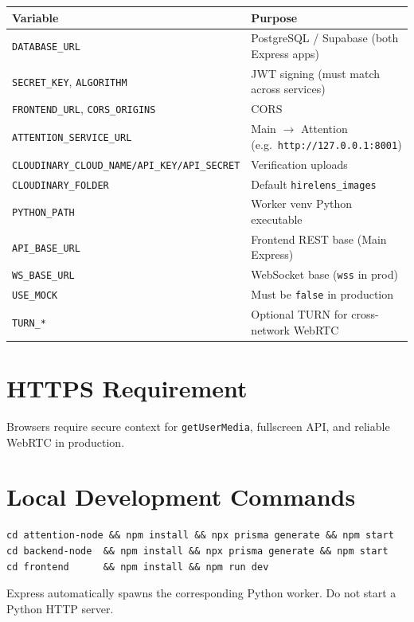 \documentclass[11pt,a4paper]{report}
\begin{document}
\begin{table}[H]
\centering
\small
\begin{tabularx}{\textwidth}{@{}lX@{}}
\toprule
\textbf{Variable} & \textbf{Purpose} \\
\midrule
\texttt{DATABASE\_URL} & PostgreSQL / Supabase (both Express apps) \\
\texttt{SECRET\_KEY}, \texttt{ALGORITHM} & JWT signing (must match across services) \\
\texttt{FRONTEND\_URL}, \texttt{CORS\_ORIGINS} & CORS \\
\texttt{ATTENTION\_SERVICE\_URL} & Main $\rightarrow$ Attention (e.g.\ \texttt{http://127.0.0.1:8001}) \\
\texttt{CLOUDINARY\_CLOUD\_NAME/API\_KEY/API\_SECRET} & Verification uploads \\
\texttt{CLOUDINARY\_FOLDER} & Default \texttt{hirelens\_images} \\
\texttt{PYTHON\_PATH} & Worker venv Python executable \\
\texttt{API\_BASE\_URL} & Frontend REST base (Main Express) \\
\texttt{WS\_BASE\_URL} & WebSocket base (\texttt{wss} in prod) \\
\texttt{USE\_MOCK} & Must be \texttt{false} in production \\
\texttt{TURN\_*} & Optional TURN for cross-network WebRTC \\
\bottomrule
\end{tabularx}
\end{table}

\section{HTTPS Requirement}
Browsers require secure context for \texttt{getUserMedia}, fullscreen API, and reliable WebRTC in production.

\section{Local Development Commands}
\begin{verbatim}
cd attention-node && npm install && npx prisma generate && npm start
cd backend-node  && npm install && npx prisma generate && npm start
cd frontend      && npm install && npm run dev
\end{verbatim}
Express automatically spawns the corresponding Python worker. Do not start a Python HTTP server.

\end{document}
